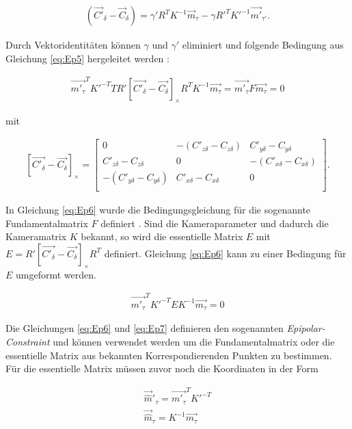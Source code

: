 \begin{gather}
	(\vec{C'}_\delta - \vec{C}_\delta) = \gamma' R^TK^{-1}\vec{m}_\tau - \gamma R'^TK'^{-1}\vec{m'}_{\tau'}. \label{eq:Ep5}
\end{gather}

Durch Vektoridentitäten können $\gamma$ und $\gamma'$ eliminiert und folgende Bedingung aus Gleichung \ref{eq:Ep5} hergeleitet werden \cite{Bronstein}: %

\begin{gather}
	\vec{m'_\tau}^TK'^{-T}TR' \left[ \vec{C'_\delta}-\vec{C_\delta}\right]_\times R^TK^{-1}\vec{m_\tau}=\vec{m'_\tau}F\vec{m_\tau} = 0\label{eq:Ep6}
\end{gather}

mit  

\begin{gather}
	\left[ \vec{C'_\delta}-\vec{C_\delta}\right]_\times=
	\begin{bmatrix}0&-(C'_{z\delta}-C_{z\delta})&C'_{y\delta}-C_{y\delta}\\
		C'_{z\delta}-C_{z\delta}&0&-(C'_{x\delta}-C_{x\delta})\\
		-(C'_{y\delta}-C_{y\delta})&C'_{x \delta}-C_{x\delta}&0\\
	\end{bmatrix}.
\end{gather}

In Gleichung \ref{eq:Ep6} wurde die Bedingungsgleichung für die sogenannte Fundamentalmatrix $F$ definiert \cite{Hoffmann}. Sind die Kameraparameter und dadurch die Kameramatrix $K$ bekannt, so wird die essentielle Matrix $E$  mit $E=R' \left[ \vec{C'_\delta}-\vec{C_\delta}\right]_\times R^T$ definiert. Gleichung \ref{eq:Ep6} kann zu einer Bedingung für $E$ umgeformt werden.

\begin{gather}
	\vec{m'_\tau}^TK'^{-T}EK^{-1}\vec{m_\tau} = 0\label{eq:Ep7}
\end{gather}

Die Gleichungen \ref{eq:Ep6} und \ref{eq:Ep7} definieren den sogenannten \textit{Epipolar-Constraint}\cite{HZ,Hoffmann} und können verwendet werden um die Fundamentalmatrix oder die essentielle Matrix aus bekannten Korrespondierenden Punkten zu bestimmen. Für die essentielle Matrix müssen zuvor noch die Koordinaten in der Form

\begin{gather}
	\vec{\hat{m}}'_\tau = \vec{m'_\tau}^TK'^{-T}\\
	\vec{\hat{m}}_\tau = K^{-1}\vec{m_\tau}\label{eq:equ8}
\end{gather}

